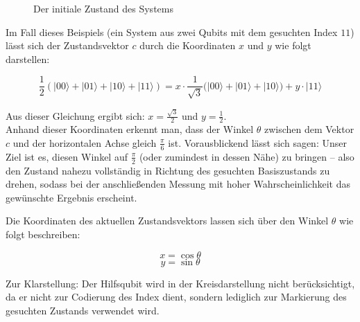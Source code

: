 \begin{figure}[H]
    \centering
    \caption{Der initiale Zustand des Systems}
    \label{fig:initial-grover-three-qubits}
\end{figure}

Im Fall dieses Beispiels (ein System aus zwei Qubits mit dem gesuchten Index $11$) lässt sich der Zustandsvektor $c$ durch die Koordinaten $x$ und $y$ wie folgt darstellen:

$$
\frac{1}{2}(|00\rangle + |01\rangle + |10\rangle + |11\rangle) = x \cdot \frac{1}{\sqrt{3}}(|00\rangle + |01\rangle + |10\rangle) + y \cdot |11\rangle
$$

\noindent Aus dieser Gleichung ergibt sich: $x = \frac{\sqrt{3}}{2}$ und $y = \frac{1}{2}$.\\

Anhand dieser Koordinaten erkennt man, dass der Winkel $\theta$ zwischen dem Vektor $c$ und der horizontalen Achse gleich $\frac{\pi}{6}$ ist. Vorausblickend lässt sich sagen: Unser Ziel ist es, diesen Winkel auf $\frac{\pi}{2}$ (oder zumindest in dessen Nähe) zu bringen – also den Zustand nahezu vollständig in Richtung des gesuchten Basiszustands zu drehen, sodass bei der anschließenden Messung mit hoher Wahrscheinlichkeit das gewünschte Ergebnis erscheint.

Die Koordinaten des aktuellen Zustandsvektors lassen sich über den Winkel $\theta$ wie folgt beschreiben:

$$
x = \cos{\theta}
$$
$$
y = \sin{\theta}
$$

Zur Klarstellung: Der Hilfsqubit wird in der Kreisdarstellung nicht berücksichtigt, da er nicht zur Codierung des Index dient, sondern lediglich zur Markierung des gesuchten Zustands verwendet wird.


